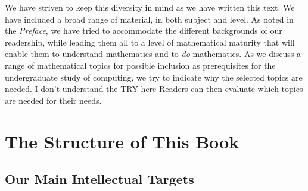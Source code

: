 We have striven to keep this diversity in mind as we have written this
text.  We have included a broad range of material, in both subject and
level.  As noted in the {\it Preface}, we have tried to accommodate
the different backgrounds of our readership, while leading them all to
a level of mathematical maturity that will enable them to understand
mathematics and to {\em do} mathematics.  As we
discuss a range of mathematical topics for possible inclusion as
prerequisites for the undergraduate study of computing, we try to
indicate why the selected topics are needed.  
{\Denis I don't understand the TRY here}
Readers can then evaluate which topics are needed for their needs.

\section{The Structure of This Book}
\label{sec:thisbook}

\subsection{Our Main Intellectual Targets}
\label{sec:book-overwiew}


